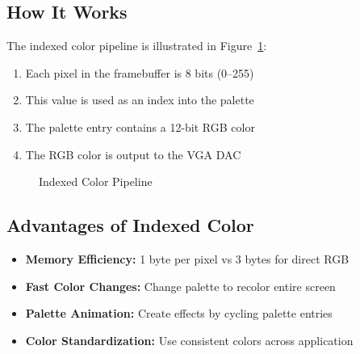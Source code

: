 \documentclass[11pt,letterpaper]{report}
\begin{document}
\subsection{How It Works}

The indexed color pipeline is illustrated in Figure~\ref{fig:color_pipeline}:

\begin{enumerate}
    \item Each pixel in the framebuffer is 8 bits (0--255)
    \item This value is used as an index into the palette
    \item The palette entry contains a 12-bit RGB color
    \item The RGB color is output to the VGA DAC
\end{enumerate}

\begin{figure}[tbp]
\centering
{}
\caption{Indexed Color Pipeline}
\label{fig:color_pipeline}
\end{figure}

\subsection{Advantages of Indexed Color}

\begin{itemize}
    \item \textbf{Memory Efficiency:} 1 byte per pixel vs 3 bytes for direct RGB
    \item \textbf{Fast Color Changes:} Change palette to recolor entire screen
    \item \textbf{Palette Animation:} Create effects by cycling palette entries
    \item \textbf{Color Standardization:} Use consistent colors across application
\end{itemize}
\end{document}

